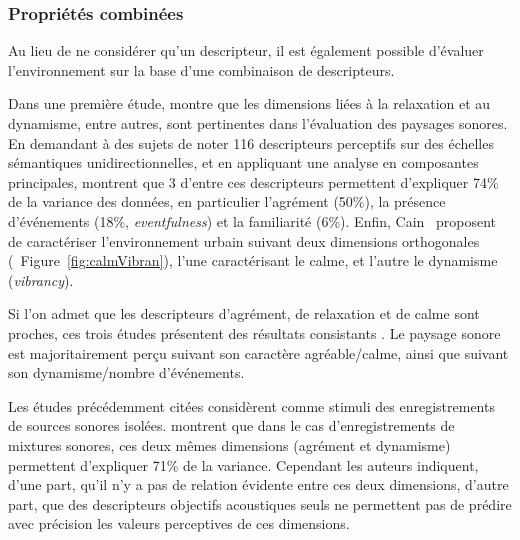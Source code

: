 \subsubsection{Propriétés combinées}

Au lieu de ne considérer qu'un descripteur, il est également possible d'évaluer l'environnement sur la base d'une combinaison de descripteurs.

Dans une première étude, \citep{kang2006urban} montre que les dimensions liées à la relaxation et au dynamisme, entre autres, sont pertinentes dans l'évaluation des paysages sonores. En demandant à des sujets de noter 116 descripteurs perceptifs sur des échelles sémantiques unidirectionnelles, et en appliquant une analyse en composantes principales, \citep{axelsson2010principal} montrent que 3 d'entre ces descripteurs permettent d'expliquer 74\% de la variance des données, en particulier l'agrément (50\%), la présence d'événements (18\%, \emph{eventfulness}) et la familiarité (6\%). Enfin, Cain~\al \citep{cain2013development} proposent de caractériser l'environnement urbain suivant deux dimensions orthogonales (\cf~Figure~\ref{fig:calmVibran}), l'une caractérisant le calme, et l'autre le dynamisme (\emph{vibrancy}).

Si l'on admet que les descripteurs d'agrément, de relaxation et de calme sont proches, ces trois études présentent des résultats consistants \citep{davies2013perception}. Le paysage sonore est majoritairement perçu suivant son caractère agréable/calme, ainsi que suivant son dynamisme/nombre d'événements.
 
Les études précédemment citées considèrent comme stimuli des enregistrements de sources sonores isolées. \citep{hall2013exploratory} montrent que dans le cas d'enregistrements de mixtures sonores, ces deux mêmes dimensions (agrément et dynamisme) permettent d'expliquer 71\% de la variance. Cependant les auteurs indiquent, d'une part, qu'il n'y a pas de relation évidente entre ces deux dimensions, d'autre part, que des descripteurs objectifs acoustiques seuls ne permettent pas de prédire avec précision les valeurs perceptives de ces dimensions.
 
